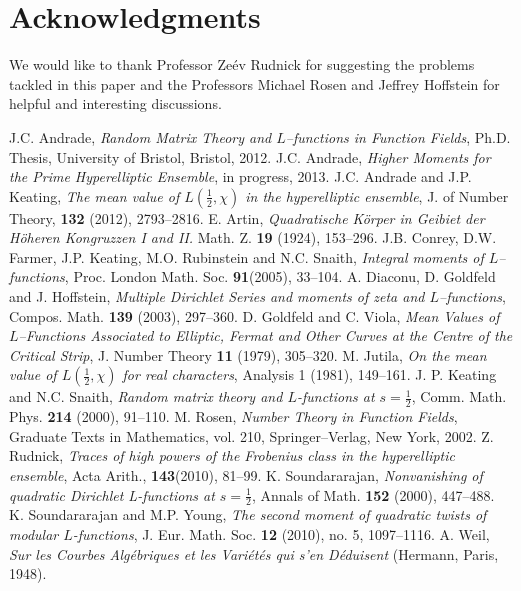 \documentclass[11pt]{amsart}
\begin{document}
\section{Acknowledgments}
We would like to thank Professor Ze\'{e}v Rudnick for suggesting the problems tackled in this paper and the Professors Michael Rosen and Jeffrey Hoffstein for helpful and interesting discussions.

\begin{thebibliography}{99}
 J.C. Andrade, {\it Random Matrix Theory and $L$--functions in Function Fields}, Ph.D. Thesis, University of Bristol, Bristol, 2012.
J.C. Andrade, {\it Higher Moments for the Prime Hyperelliptic Ensemble}, in progress, 2013.
 J.C. Andrade and J.P. Keating, {\it The mean value of $L(\tfrac{1}{2},\chi)$ in the hyperelliptic ensemble}, J. of Number Theory, \textbf{132} (2012), 2793--2816.
E. Artin, \emph{Quadratische K\"{o}rper in Geibiet der H\"{o}heren Kongruzzen I and II.} 
Math. Z.  \textbf{19} (1924), 153--296.
 J.B. Conrey, D.W. Farmer, J.P. Keating, M.O. Rubinstein and N.C. Snaith, {\it Integral moments of $L$--functions}, Proc. London Math. Soc. \textbf{91}(2005), 33--104.
 A. Diaconu, D. Goldfeld and J. Hoffstein, {\it Multiple Dirichlet Series and moments of zeta and $L$--functions}, Compos. Math. \textbf{139} (2003), 297--360.
 D. Goldfeld and C. Viola, {\it Mean Values of $L$--Functions Associated to Elliptic, Fermat and Other Curves at the Centre of the Critical Strip}, J. Number Theory \textbf{11} (1979), 305--320. 
 M. Jutila, {\it On the mean value of $L(\tfrac{1}{2},\chi)$ for real characters}, Analysis 1 (1981), 149--161.
 J. P. Keating and N.C. Snaith, {\it Random matrix theory and $L$-functions at $s=\tfrac{1}{2}$}, Comm. Math. Phys. \textbf{214} (2000), 91--110.
 M. Rosen, {\it Number Theory in Function Fields}, Graduate Texts in Mathematics, vol. 210, Springer--Verlag, New York, 2002.
 Z. Rudnick, {\it Traces of high powers of the Frobenius class in the hyperelliptic ensemble}, Acta Arith., \textbf{143}(2010), 81--99.
 K. Soundararajan, {\it Nonvanishing of quadratic Dirichlet L-functions at $s=\frac{1}{2}$}, Annals of Math. \textbf{152} (2000), 447--488.
 K. Soundararajan and M.P. Young, {\it The second moment of quadratic twists of modular $L$-functions}, J. Eur. Math. Soc. \textbf{12} (2010), no. 5, 1097--1116.
 A. Weil, {\it Sur les Courbes Alg\'{e}briques et les Vari\'{e}t\'{e}s qui s'en D\'{e}duisent} (Hermann, Paris, 1948).
\end{thebibliography}
\end{document}
